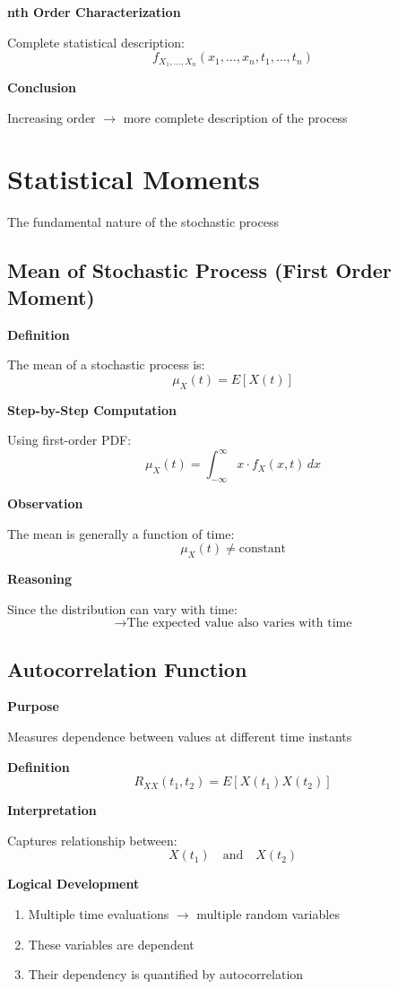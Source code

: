 \documentclass[12pt]{article}
\begin{document}
\textbf{nth Order Characterization}  

Complete statistical description:
\[
f_{X_1, \dots, X_n}(x_1, \dots, x_n, t_1, \dots, t_n)
\]

\textbf{Conclusion}  

Increasing order $\rightarrow$ more complete description of the process

\section{Statistical Moments}

The fundamental nature of the stochastic process

\subsection{Mean of Stochastic Process (First Order Moment)}

\textbf{Definition}  

The mean of a stochastic process is:
\[
\mu_X(t) = E[X(t)]
\]

\textbf{Step-by-Step Computation}  

Using first-order PDF:
\[
\mu_X(t) = \int_{-\infty}^{\infty} x \cdot f_X(x, t)\, dx
\]

\textbf{Observation}  

The mean is generally a function of time:
\[
\mu_X(t) \neq \text{constant}
\]

\textbf{Reasoning}  

Since the distribution can vary with time:
\[
\rightarrow \text{The expected value also varies with time}
\]

\subsection{Autocorrelation Function}

\textbf{Purpose}  

Measures dependence between values at different time instants

\textbf{Definition}  
\[
R_{XX}(t_1, t_2) = E[X(t_1)X(t_2)]
\]

\textbf{Interpretation}  

Captures relationship between:
\[
X(t_1) \quad \text{and} \quad X(t_2)
\]

\textbf{Logical Development}
\begin{enumerate}
    \item Multiple time evaluations $\rightarrow$ multiple random variables
    \item These variables are dependent
    \item Their dependency is quantified by autocorrelation
\end{enumerate}
\end{document}
